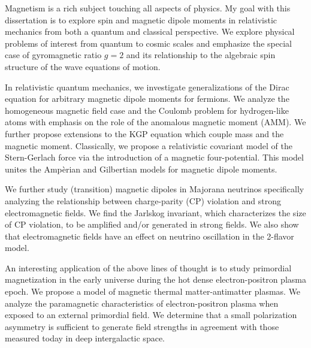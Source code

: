 

Magnetism is a rich subject touching all aspects of physics. My goal with this dissertation is to explore spin and magnetic dipole moments in relativistic mechanics from both a quantum and classical perspective. We explore physical problems of interest from quantum to cosmic scales and emphasize the special case of gyromagnetic ratio $g\!=\!2$ and its relationship to the algebraic spin structure of the wave equations of motion.

In relativistic quantum mechanics, we investigate generalizations of the Dirac equation for arbitrary magnetic dipole moments for fermions. We analyze the homogeneous magnetic field case and the Coulomb problem for hydrogen-like atoms with emphasis on the role of the anomalous magnetic moment (AMM). We further propose extensions to the KGP equation which couple mass and the magnetic moment. Classically, we propose a relativistic covariant model of the Stern-Gerlach force via the introduction of a magnetic four-potential. This model unites the Amp{\`e}rian and Gilbertian models for magnetic dipole moments.

We further study (transition) magnetic dipoles in Majorana neutrinos specifically analyzing the relationship between charge-parity (CP) violation and strong electromagnetic fields. We find the Jarlskog invariant, which characterizes the size of CP violation, to be amplified and/or generated in strong fields. We also show that electromagnetic fields have an effect on neutrino oscillation in the 2-flavor model.

An interesting application of the above lines of thought is to study primordial magnetization in the early universe during the hot dense electron-positron plasma epoch. We propose a model of magnetic thermal matter-antimatter plasmas. We analyze the paramagnetic characteristics of electron-positron plasma when exposed to an external primordial field. We determine that a small polarization asymmetry is sufficient to generate field strengths in agreement with those measured today in deep intergalactic space.